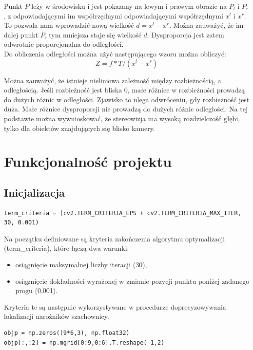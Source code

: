 \documentclass[magisterska]{pracadypl}
\begin{document}
Punkt $P$ leży w środowisku i jest pokazany na
lewym i prawym obrazie na $P_l$ i $P_r$, z odpowiadającymi im współrzędnymi
odpowiadającymi współrzędnymi $x^l$ i $x^r$. To pozwala nam wprowadzić nową wielkość $d = x^l - x^r$.
Można zauważyć, że im dalej punkt $P$, tym mniejsza staje się wielkość $d$. Dysproporcja jest zatem odwrotnie proporcjonalna do odległości.\\
Do obliczenia odległości można użyć następującego wzoru można obliczyć: \[Z=f*T/(x^l-x^r)\]

Można zauważyć, że istnieje nieliniowa zależność między rozbieżnością, a odległością.
Jeśli rozbieżność jest bliska 0, małe różnice w rozbieżności prowadzą do dużych różnic w odległości.
Zjawisko to ulega odwróceniu, gdy rozbieżność jest duża. Małe różnice dysproporcji nie prowadzą do dużych różnic odległości. Na tej podstawie można wywnioskować, że stereowizja ma wysoką rozdzielczość głębi, tylko dla obiektów znajdujących się blisko kamery.

\chapter{Funkcjonalność projektu}

\section*{Inicjalizacja}

\begin{lstlisting}[style=mypython]
term_criteria = (cv2.TERM_CRITERIA_EPS + cv2.TERM_CRITERIA_MAX_ITER, 30, 0.001)
\end{lstlisting}

Na początku definiowane są kryteria zakończenia algorytmu optymalizacji (term\_criteria), które łączą dwa warunki:

\begin{itemize}
    \item osiągnięcie maksymalnej liczby iteracji (30),
    \item osiągnięcie dokładności wyrażonej w zmianie pozycji punktu poniżej zadanego progu (0.001).
\end{itemize}

Kryteria te są następnie wykorzystywane w procedurze doprecyzowywania lokalizacji narożników szachownicy.

\begin{lstlisting}[style=mypython]
objp = np.zeros((9*6,3), np.float32)
objp[:,:2] = np.mgrid[0:9,0:6].T.reshape(-1,2)
\end{lstlisting}
\end{document}
